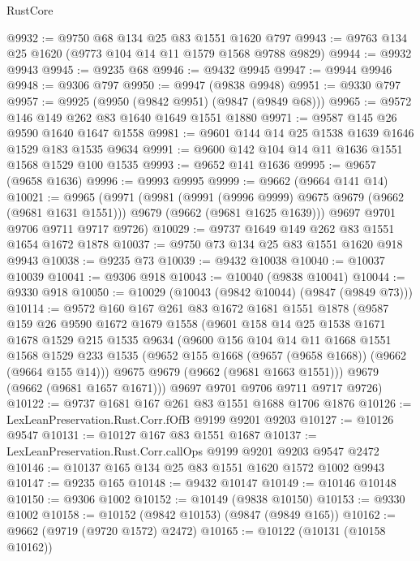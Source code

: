 \begin{lexlean}{RustCore}
\begin{coremodule}
@9932 := @9750 @68 @134 @25 @83 @1551 @1620 @797
@9943 := @9763 @134 @25 @1620 (@9773 @104 @14 @11 @1579 @1568 @9788 @9829)
@9944 := @9932 @9943
@9945 := @9235 @68
@9946 := @9432 @9945
@9947 := @9944 @9946
@9948 := @9306 @797
@9950 := @9947 (@9838 @9948)
@9951 := @9330 @797
@9957 := @9925 (@9950 (@9842 @9951) (@9847 (@9849 @68)))
@9965 := @9572 @146 @149 @262 @83 @1640 @1649 @1551 @1880
@9971 := @9587 @145 @26 @9590 @1640 @1647 @1558
@9981 := @9601 @144 @14 @25 @1538 @1639 @1646 @1529 @183 @1535 @9634
@9991 := @9600 @142 @104 @14 @11 @1636 @1551 @1568 @1529 @100 @1535
@9993 := @9652 @141 @1636
@9995 := @9657 (@9658 @1636)
@9996 := @9993 @9995
@9999 := @9662 (@9664 @141 @14)
@10021 := @9965
    (@9971
      (@9981
        (@9991 (@9996 @9999) @9675 @9679 (@9662 (@9681 @1631 @1551)))
        @9679
        (@9662 (@9681 @1625 @1639)))
      @9697
      @9701
      @9706
      @9711
      @9717
      @9726)
@10029 := @9737 @1649 @149 @262 @83 @1551 @1654 @1672 @1878
@10037 := @9750 @73 @134 @25 @83 @1551 @1620 @918 @9943
@10038 := @9235 @73
@10039 := @9432 @10038
@10040 := @10037 @10039
@10041 := @9306 @918
@10043 := @10040 (@9838 @10041)
@10044 := @9330 @918
@10050 := @10029 (@10043 (@9842 @10044) (@9847 (@9849 @73)))
@10114 := @9572
    @160
    @167
    @261
    @83
    @1672
    @1681
    @1551
    @1878
    (@9587
      @159
      @26
      @9590
      @1672
      @1679
      @1558
      (@9601
        @158
        @14
        @25
        @1538
        @1671
        @1678
        @1529
        @215
        @1535
        @9634
        (@9600
          @156
          @104
          @14
          @11
          @1668
          @1551
          @1568
          @1529
          @233
          @1535
          (@9652 @155 @1668 (@9657 (@9658 @1668)) (@9662 (@9664 @155 @14)))
          @9675
          @9679
          (@9662 (@9681 @1663 @1551)))
        @9679
        (@9662 (@9681 @1657 @1671)))
      @9697
      @9701
      @9706
      @9711
      @9717
      @9726)
@10122 := @9737 @1681 @167 @261 @83 @1551 @1688 @1706 @1876
@10126 := LexLeanPreservation.Rust.Corr.fOfB @9199 @9201 @9203
@10127 := @10126 @9547
@10131 := @10127 @167 @83 @1551 @1687
@10137 := LexLeanPreservation.Rust.Corr.callOps @9199 @9201 @9203 @9547 @2472
@10146 := @10137 @165 @134 @25 @83 @1551 @1620 @1572 @1002 @9943
@10147 := @9235 @165
@10148 := @9432 @10147
@10149 := @10146 @10148
@10150 := @9306 @1002
@10152 := @10149 (@9838 @10150)
@10153 := @9330 @1002
@10158 := @10152 (@9842 @10153) (@9847 (@9849 @165))
@10162 := @9662 (@9719 (@9720 @1572) @2472)
@10165 := @10122 (@10131 (@10158 @10162))

\end{coremodule}
\end{lexlean}
